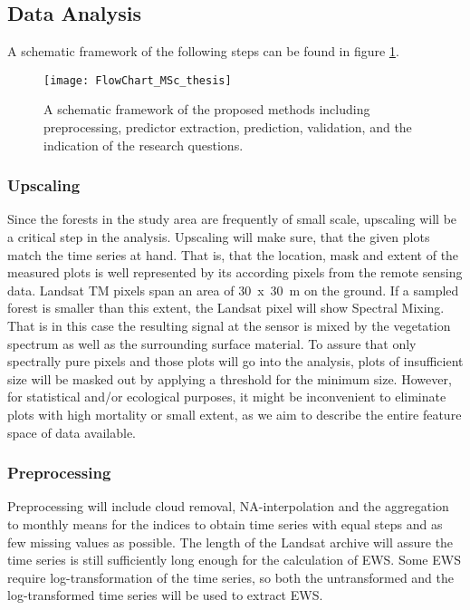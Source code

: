 \subsection{Data Analysis}\label{subsec:analysis}
A schematic framework of the following steps can be found in figure \ref{fig:flowchart}.

\begin{figure}[ht]
	\centering
	\texttt{[image: FlowChart\_MSc\_thesis]}
	\caption{A schematic framework of the proposed methods including preprocessing, predictor extraction, prediction, validation, and the indication of the research questions.}\label{fig:flowchart}
\end{figure}	

\subsubsection{Upscaling}
Since the forests in the study area are frequently of small scale, upscaling will be a critical step in the analysis. Upscaling will make sure, that the given plots match the time series at hand. That is, that the location, mask and extent of the measured plots is well represented by its according pixels from the remote sensing data. Landsat TM pixels span an area of 30~x~30~m on the ground. If a sampled forest is smaller than this extent, the Landsat pixel will show Spectral Mixing. That is in this case the resulting signal at the sensor is mixed by the vegetation spectrum as well as the surrounding surface material. To assure that only spectrally pure pixels and those plots will go into the analysis, plots of insufficient size will be masked out by applying a threshold for the minimum size. However, for statistical and/or ecological purposes, it might be inconvenient to eliminate plots with high mortality or small extent, as we aim to describe the entire feature space of data available.


\subsubsection{Preprocessing}
Preprocessing will include cloud removal, NA-interpolation and the aggregation to monthly means \citep[comparable to][]{verbesselt2016} for the indices to obtain time series with equal steps and as few missing values as possible. The length of the Landsat archive will assure the time series is still sufficiently long enough for the calculation of EWS. Some EWS require log-transformation of the time series, so both the untransformed and the log-transformed time series will be used to extract EWS.



